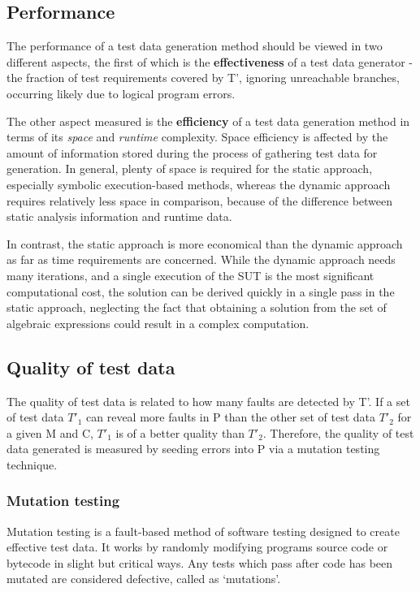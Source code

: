 \documentclass{icldt}
\numberwithin{equation}{section}       %
\begin{document}
{{\subsection{Performance}
The performance of a test data generation method should be viewed in two different aspects, the first of which is the \textbf{effectiveness} of a test data generator - the fraction of test requirements covered by T', ignoring unreachable branches, occurring likely due to logical program errors.

The other aspect measured is the \textbf{efficiency} of a test data generation method in terms of its \emph{space} and \emph{runtime} complexity. Space efficiency is affected by the amount of information stored during the process of gathering test data for generation. In general, plenty of space is required for the static approach, especially symbolic execution-based methods, whereas the dynamic approach requires relatively less space in comparison, because of the difference between static analysis information and runtime data.

In contrast, the static approach is more economical than the dynamic approach as far as time requirements are concerned. While the dynamic approach needs many iterations, and a single execution of the SUT is the most significant computational cost, the solution can be derived quickly in a single pass in the static approach, neglecting the fact that obtaining a solution from the set of algebraic expressions could result in a complex computation.

\subsection{Quality of test data}
The quality of test data is related to how many faults are detected by T'. If a set of test data $T'_1$ can reveal more faults in P than the other set of test data $T'_2$ for a given M and C, $T'_1$ is of a better quality than $T'_2$. Therefore, the quality of test data generated is measured by seeding errors into P via a mutation testing technique.

\subsubsection{Mutation testing}
Mutation testing is a fault-based method of software testing designed to create effective test data. It works by randomly modifying programs source code or bytecode in slight but critical ways. Any tests which pass after code has been mutated are considered defective, called as `mutations'.

}}
\end{document}
